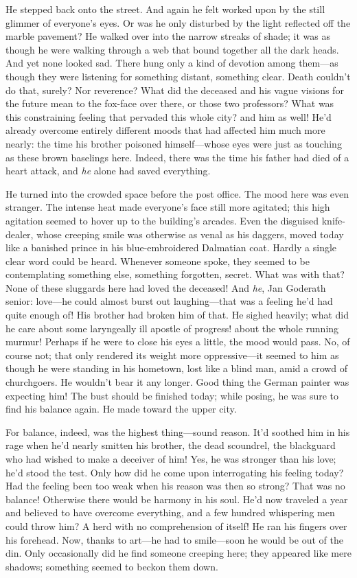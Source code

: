 \documentclass[12pt,a4paper]{article}
\begin{document}
He stepped back onto the street. And again he felt worked upon by the still glimmer of everyone’s eyes. Or was he only disturbed by the light reflected off the marble pavement? He walked over into the narrow streaks of shade; it was as though he were walking through a web that bound together all the dark heads. And yet none looked sad. There hung only a kind of devotion among them—as though they were listening for something distant, something clear. Death couldn’t do that, surely? Nor reverence? What did the deceased and his vague visions for the future mean to the fox-face over there, or those two professors? What was this constraining feeling that pervaded this whole city? and him as well! He’d already overcome entirely different moods that had affected him much more nearly: the time his brother poisoned himself—whose eyes were just as touching as these brown baselings here. Indeed, there was the time his father had died of a heart attack, and \textit{he} alone had saved everything.

He turned into the crowded space before the post office. The mood here was even stranger. The intense heat made everyone’s face still more agitated; this high agitation seemed to hover up to the building’s arcades. Even the disguised knife-dealer, whose creeping smile was otherwise as venal as his daggers, moved today like a banished prince in his blue-embroidered Dalmatian coat. Hardly a single clear word could be heard. Whenever someone spoke, they seemed to be contemplating something else, something forgotten, secret. What was with that? None of these sluggards here had loved the deceased! And \textit{he}, Jan Goderath senior: love—he could almost burst out laughing—that was a feeling he’d had quite enough of! His brother had broken him of that. He sighed heavily; what did he care about some laryngeally ill apostle of progress! about the whole running murmur! Perhaps if he were to close his eyes a little, the mood would pass. No, of course not; that only rendered its weight more oppressive—it seemed to him as though he were standing in his hometown, lost like a blind man, amid a crowd of churchgoers. He wouldn’t bear it any longer. Good thing the German painter was expecting him! The bust should be finished today; while posing, he was sure to find his balance again. He made toward the upper city.

For balance, indeed, was the highest thing—sound reason. It’d soothed him in his rage when he’d nearly smitten his brother, the dead scoundrel, the blackguard who had wished to make a deceiver of him! Yes, he was stronger than his love; he’d stood the test. Only how did he come upon interrogating his feeling today? Had the feeling been too weak when his reason was then so strong? That was no balance! Otherwise there would be harmony in his soul. He’d now traveled a year and believed to have overcome everything, and a few hundred whispering men could throw him? A herd with no comprehension of itself! He ran his fingers over his forehead. Now, thanks to art—he had to smile—soon he would be out of the din. Only occasionally did he find someone creeping here; they appeared like mere shadows; something seemed to beckon them down.
\end{document}
